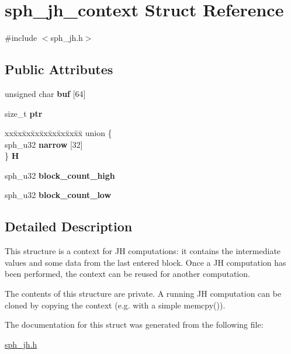 \hypertarget{structsph__jh__context}{}\section{sph\+\_\+jh\+\_\+context Struct Reference}
\label{structsph__jh__context}


{\ttfamily \#include $<$sph\+\_\+jh.\+h$>$}

\subsection*{Public Attributes}
\begin{DoxyCompactItemize}
\item 
\mbox{\label{structsph__jh__context_a3dc7aa585cff408e168f5d0c5cc61400}} 
unsigned char {\bfseries buf} \mbox{[}64\mbox{]}
\item 
\mbox{\label{structsph__jh__context_aa6880d19dbdea6b710eb36447c4fc835}} 
size\+\_\+t {\bfseries ptr}
\item 
\mbox{\label{structsph__jh__context_af2f1f44eb828804cc401dbca5cca8551}} 
\begin{tabbing}
xx\=xx\=xx\=xx\=xx\=xx\=xx\=xx\=xx\=\kill
union \{\\
\>sph\_u32 {\bfseries narrow} \mbox{[}32\mbox{]}\\
\} {\bfseries H}\\

\end{tabbing}\item 
\mbox{\label{structsph__jh__context_a7ae4f4f5695c9d96ced8beeefe9e5114}} 
sph\+\_\+u32 {\bfseries block\+\_\+count\+\_\+high}
\item 
\mbox{\label{structsph__jh__context_a0aefbe622c0463e587bcd8fc257f8ecf}} 
sph\+\_\+u32 {\bfseries block\+\_\+count\+\_\+low}
\end{DoxyCompactItemize}


\subsection{Detailed Description}
This structure is a context for JH computations\+: it contains the intermediate values and some data from the last entered block. Once a JH computation has been performed, the context can be reused for another computation.

The contents of this structure are private. A running JH computation can be cloned by copying the context (e.\+g. with a simple {\ttfamily memcpy()}). 

The documentation for this struct was generated from the following file\+:\begin{DoxyCompactItemize}
\item 
\mbox{\hyperlink{sph__jh_8h}{sph\+\_\+jh.\+h}}\end{DoxyCompactItemize}
